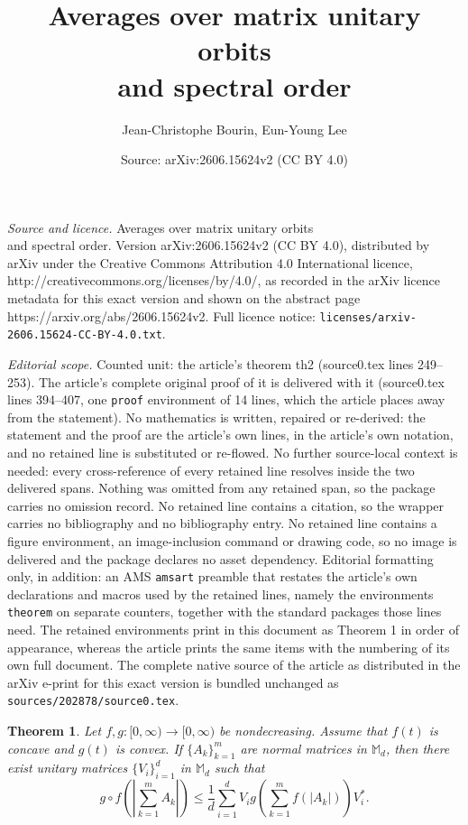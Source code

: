 \documentclass[10pt,a4paper]{amsart}
\title{Averages over matrix unitary orbits \\ and spectral order}
\author{Jean-Christophe Bourin, Eun-Young Lee}
\date{Source: arXiv:2606.15624v2 (CC BY 4.0)}
\newtheorem{theorem}{Theorem}
\def\bM{\mathbb{M}}
\begin{document}
\maketitle

\noindent\emph{Source and licence.} Averages over matrix unitary orbits \\ and spectral order. Version arXiv:2606.15624v2 (CC BY 4.0), distributed by arXiv under the Creative Commons Attribution 4.0 International licence, http://creativecommons.org/licenses/by/4.0/, as recorded in the arXiv licence metadata for this exact version and shown on the abstract page https://arxiv.org/abs/2606.15624v2. Full licence notice: \texttt{licenses/arxiv-2606.15624-CC-BY-4.0.txt}.\par\smallskip

\noindent\textit{Editorial scope.} Counted unit: the article's theorem th2 (source0.tex lines 249--253). The article's complete original proof of it is delivered with it (source0.tex lines 394--407, one \texttt{proof} environment of 14 lines, which the article places away from the statement). No mathematics is written, repaired or re-derived: the statement and the proof are the article's own lines, in the article's own notation, and no retained line is substituted or re-flowed.  No further source-local context is needed: every cross-reference of every retained line resolves inside the two delivered spans.  Nothing was omitted from any retained span, so the package carries no omission record.  No retained line contains a citation, so the wrapper carries no bibliography and no bibliography entry.  No retained line contains a figure environment, an image-inclusion command or drawing code, so no image is delivered and the package declares no asset dependency.  Editorial formatting only, in addition: an AMS \texttt{amsart} preamble that restates the article's own declarations and macros used by the retained lines, namely the environments \texttt{theorem} on separate counters, together with the standard packages those lines need.  The retained environments print in this document as Theorem 1 in order of appearance, whereas the article prints the same items with the numbering of its own full document.  The complete native source of the article as distributed in the arXiv e-print for this exact version is bundled unchanged as \texttt{sources/202878/source0.tex}.
\begin{theorem}\label{th2} Let $f,g:[0,\infty)\to[0,\infty)$ be nondecreasing. Assume that $f(t)$ is concave and  $g(t)$ is convex. If $\{A_k\}_{k=1}^m$ are  normal matrices in $\bM_d$, then there exist unitary matrices $\{V_i\}_{i=1}^d$  in $\bM_d$ such that 
$$ 
g\circ f\left(\left|\sum_{k=1}^m A_k\right|\right) \le \frac{1}{d} \sum_{i=1}^d V_i g\left(\sum_{k=1}^m f(|A_k|)\right)V_i^*.
$$
\end{theorem}
\end{document}
